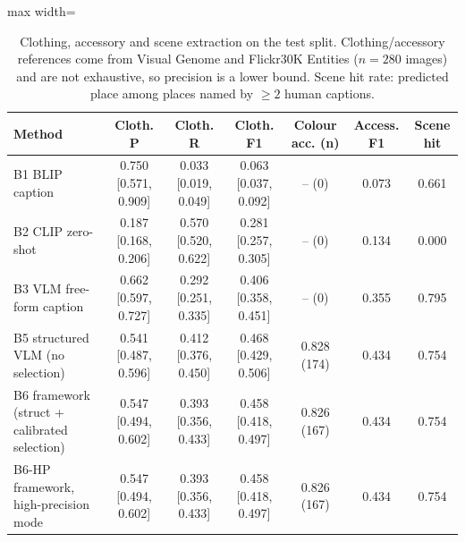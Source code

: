 \begin{table}[!t]
\centering
\scriptsize
\caption{Clothing, accessory and scene extraction on the test split. Clothing/accessory references come from Visual Genome and Flickr30K Entities ($n=280$ images) and are not exhaustive, so precision is a lower bound. Scene hit rate: predicted place among places named by $\geq2$ human captions.}
\label{tab:exp1_attributes}
\begin{adjustbox}{max width=\textwidth}
\begin{tabular}{lcccccc}
\toprule
Method & Cloth. P & Cloth. R & Cloth. F1 & Colour acc. (n) & Access. F1 & Scene hit \\
\midrule
B1 BLIP caption & 0.750 [0.571, 0.909] & 0.033 [0.019, 0.049] & 0.063 [0.037, 0.092] & -- (0) & 0.073 & 0.661 \\
B2 CLIP zero-shot & 0.187 [0.168, 0.206] & 0.570 [0.520, 0.622] & 0.281 [0.257, 0.305] & -- (0) & 0.134 & 0.000 \\
B3 VLM free-form caption & 0.662 [0.597, 0.727] & 0.292 [0.251, 0.335] & 0.406 [0.358, 0.451] & -- (0) & 0.355 & 0.795 \\
B5 structured VLM (no selection) & 0.541 [0.487, 0.596] & 0.412 [0.376, 0.450] & 0.468 [0.429, 0.506] & 0.828 (174) & 0.434 & 0.754 \\
B6 framework (struct + calibrated selection) & 0.547 [0.494, 0.602] & 0.393 [0.356, 0.433] & 0.458 [0.418, 0.497] & 0.826 (167) & 0.434 & 0.754 \\
B6-HP framework, high-precision mode & 0.547 [0.494, 0.602] & 0.393 [0.356, 0.433] & 0.458 [0.418, 0.497] & 0.826 (167) & 0.434 & 0.754 \\
\bottomrule
\end{tabular}
\end{adjustbox}
\end{table}
